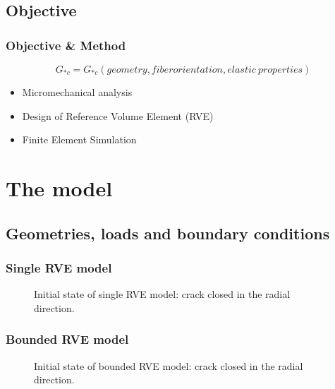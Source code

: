 \documentclass[first,firstsupp,lastsupp,handout,last,hyperref,table]{ETHclass}
\begin{document}
\subsection{Objective}

\begin{frame}
\vspace*{-1cm}
\frametitle{Objective \& Method}
\begin{equation}
G_{*c}=G_{*c}\left(geometry, fiber orientation, elastic\ properties\right)
\end{equation}
\begin{itemize}
    \item Micromechanical analysis
    \item Design of Reference Volume Element (RVE)
    \item Finite Element Simulation
\end{itemize}
\end{frame}

\section{The model}

\subsection{Geometries, loads and boundary conditions}

\begin{frame}
\frametitle{Single RVE model}
\vspace{-0.75cm}
\centering
\begin{figure}[!h]
\centering
  \caption{\scriptsize Initial state of single RVE model: crack closed in the radial direction.}
  \label{fig:singleRVE_onlycc}
\end{figure}
\end{frame}

\begin{frame}
\frametitle{Bounded RVE model}
\vspace{-0.75cm}
\centering
\begin{figure}[!h]
\centering
  \caption{\scriptsize Initial state of bounded RVE model: crack closed in the radial direction.}
  \label{fig:boundedRVE_onlycc}
\end{figure}
\end{frame}
\end{document}
